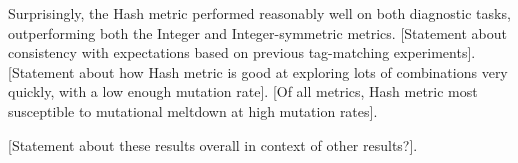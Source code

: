Surprisingly, the Hash metric performed reasonably well on both diagnostic tasks, outperforming both
the Integer and Integer-symmetric metrics.
[Statement about consistency with expectations based on previous tag-matching experiments].
[Statement about how Hash metric is good at exploring lots of combinations very quickly, with a low
enough mutation rate].
[Of all metrics, Hash metric most susceptible to mutational meltdown at high mutation rates].

[Statement about these results overall in context of other results?].